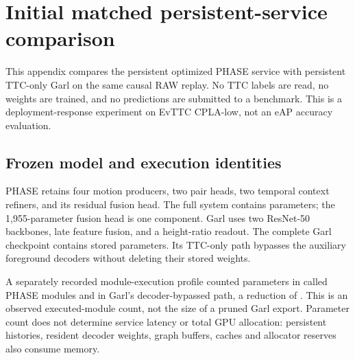 \section{Initial matched persistent-service comparison}
\label{sec:local-hardware}

This appendix compares the persistent optimized PHASE service with persistent TTC-only Garl on the same causal RAW replay. No TTC labels are read, no weights are trained, and no predictions are submitted to a benchmark. This is a deployment-response experiment on EvTTC CPLA-low, not an eAP accuracy evaluation.

\begin{table}[H]
\centering\small
\caption{\textbf{Persistent-service response, in milliseconds.} The primary summary is the median and range of the three per-pass scheduled-arrival p95 values. Outputs count all scheduled updates across all three passes. These are repeated timings of the same 250 anchors, not 750 independent samples.}
\label{tab:persistent-primary}

\end{table}



\subsection{Frozen model and execution identities}

PHASE retains four motion producers, two pair heads, two temporal context refiners, and its residual fusion head. The full system contains \LocalPhaseParameters{} parameters; the 1,955-parameter fusion head is one component. Garl uses two ResNet-50 backbones, late feature fusion, and a height-ratio readout. The complete Garl checkpoint contains \LocalGarlStoredParameters{} stored parameters. Its TTC-only path bypasses the auxiliary foreground decoders without deleting their stored weights.

\begin{table}[H]
\centering\small
\caption{\textbf{Complete PHASE parameter inventory.} Counts come from the strictly loaded distributed components and remain separate from service memory and latency.}

\end{table}

A separately recorded module-execution profile counted \LocalPhaseExecutedParameters{} parameters in called PHASE modules and \LocalGarlTTCParameters{} in Garl's decoder-bypassed path, a reduction of \LocalExecutedParameterReduction{}. This is an observed executed-module count, not the size of a pruned Garl export. Parameter count does not determine service latency or total GPU allocation: persistent histories, resident decoder weights, graph buffers, caches and allocator reserves also consume memory.

